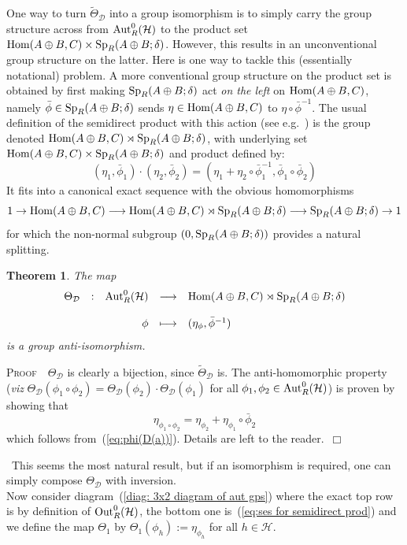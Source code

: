 \documentclass[12pt]{article}
\newtheorem{thm}{Theorem}[section]
\newcommand{\Aut}{{\rm Aut}}
\newcommand{\bPf}{\noindent \textsc{Proof\ }}
\newcommand{\cD}{\ensuremath{\mathcal{D}}}
\newcommand{\cH}{\ensuremath{\mathcal{H}}}
\newcommand{\displaymapdef}[5]
{
	\begin{array}{rcrcl}
		#1 &:& #2 &\longrightarrow& #3 \\
		& &    &                    \\
		& & #4 &\longmapsto    & #5
	\end{array}
}
\newcommand{\ePf}{~$\Box$\vertsp\par}%
\newcommand{\Hom}{{\rm Hom}}
\newcommand{\inv}{^{-1}}%
\newcommand{\Out}{{\rm Out}}
\renewcommand{\rem}{\refstepcounter{rem}\noindent{\sc Remark \therem}}
\renewcommand{\t}[1]{\tilde{#1}}
\renewcommand{\therem}{\thesection.\arabic{rem}}
\newcommand{\vertsp}{\vspace{1ex}}
\newcommand{\AdsB}{\ensuremath{A\oplus B}}
\newcommand{\SpABd}[1]{\ensuremath{{\rm Sp}_{#1}(\AdsB;\delta)}}
\begin{document}
One way to turn $\t \Theta_\cD$ into a group isomorphism is to simply carry the group structure across from $\Aut^0_R(\cH)$
to the product set $\Hom(\AdsB,C)\times\SpABd{R}$. However, this results in an unconventional 
group structure on the latter. Here is one way to tackle this (essentially notational) problem. A more conventional group structure on the product set is obtained  by first making  $\SpABd{R}$ act 
\textit{on the left} on 
$\Hom(\AdsB,C)$, namely 
$\bar \phi\in\SpABd{R}$ sends 
$\eta\in \Hom(\AdsB,C)$ to 
$\eta\circ\bar \phi\inv$. 
The usual definition of the 
semidirect product with this action (see e.g.~\cite{Wi}) is the group  
denoted $\Hom(\AdsB,C)\rtimes\SpABd{R}$, with underlying set 
$\Hom(\AdsB,C)\times\SpABd{R}$ and product defined by:
$$
(\eta_1,\bar \phi_1)\cdot(\eta_2,\bar \phi_2)=(\eta_1 + \eta_2\circ \bar \phi_1\inv, \bar \phi_1\circ\bar \phi_2)
$$
It fits into a canonical exact sequence with the obvious homomorphisms
\begin{equation}\label{eq:ses for semidirect prod}
	1\rightarrow \Hom(\AdsB,C)
	\longrightarrow \Hom(\AdsB,C)\rtimes\SpABd{R}
	\longrightarrow
	\SpABd{R}\rightarrow 1
\end{equation}
%
for which the non-normal subgroup $(0,\SpABd{R})$ provides a natural splitting. 
\begin{thm}\label{thm:about Theta}
	The map 
	$$
	\displaymapdef{\Theta_\cD}{\Aut^0_R(\cH)}
	{\Hom(\AdsB,C)\rtimes\SpABd{R}}
	{\phi}
	{(\eta_{\phi},
	\bar{\phi}\inv)}
	$$
	is a group {\em anti}-isomorphism. 
\end{thm}
\bPf\ $\Theta_\cD$ is clearly a bijection, since $\t \Theta_\cD$ is. The anti-homomorphic property (\textit{viz} $\Theta_\cD(\phi_1\circ\phi_2)=\Theta_\cD(\phi_2)\cdot\Theta_\cD(\phi_1)$ for all $\phi_1,\phi_2\in\Aut^0_R(\cH)$) is proven by showing that 
$$
\eta_{\phi_1\circ\phi_2}=\eta_{\phi_2}+\eta_{\phi_1}\circ \bar{\phi}_2
$$
which follows from~(\ref{eq:phi(D(a))}). Details are left to the reader.\ePf
\rem\ This seems the most natural result, but if an isomorphism is required, one can simply compose $\Theta_\cD$ with inversion.\bigskip\\
Now consider diagram~(\ref{diag: 3x2 diagram of aut gps}) where the exact top row is by definition of $\Out^0_R(\cH)$, the bottom one is~(\ref{eq:ses for semidirect prod}) and we define the map $\Theta_1$  by 
$\Theta_1(\phi_h):=\eta_{\phi_h}$ for all $h\in\cH$.
\end{document}
